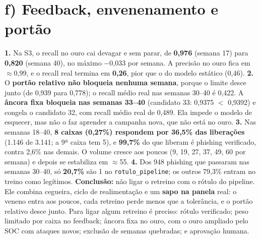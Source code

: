 \documentclass[10pt,a4paper]{article}
\newcommand{\code}[1]{\texttt{\small #1}}
\begin{document}
\section*{f) Feedback, envenenamento e portão}
\textbf{1.} Na S3, o recall no ouro cai devagar e sem parar, de \textbf{0,976} (semana 17) para \textbf{0,820} (semana 40), no máximo $-$0,033 por semana. A precisão no ouro fica em $\approx$0,99, e o recall real termina em \textbf{0,26}, pior que o do modelo estático (0,46).
\textbf{2.} O \textbf{portão relativo não bloqueia nenhuma semana}, porque o limite desce junto (de 0,939 para 0,778); o recall médio real nas semanas 30--40 é 0,422. A \textbf{âncora fixa bloqueia nas semanas 33--40} (candidato 33: 0,9375 $<$ 0,9392) e congela o candidato 32, com recall médio real de 0,489. Ela impede o modelo de esquecer, mas não o faz aprender a campanha nova, que não está no ouro.
\textbf{3.} Nas semanas 18--40, \textbf{8 caixas (0,27\%) respondem por 36,5\% das liberações} (1.146 de 3.141; a 9ª caixa tem 5), e \textbf{99,7\%} do que liberam é phishing verificado, contra 2,6\% nas demais. O volume cresce aos poucos (9, 19, 27, 37, 49, 60 por semana) e depois se estabiliza em $\approx$55.
\textbf{4.} Dos 948 phishing que passaram nas semanas 30--40, só \textbf{20,7\%} são 1 no \code{rotulo\_pipeline}; os outros 79,3\% entram no treino como legítimos.
\textbf{Conclusão:} não ligar o retreino com o rótulo do pipeline. Ele combina cegueira, ciclo de realimentação e um \textbf{sapo na panela} real: o veneno entra aos poucos, cada retreino perde menos que a tolerância, e o portão relativo desce junto. Para ligar algum retreino é preciso: rótulo verificado; peso limitado por caixa no feedback; âncora fixa no ouro, com o ouro ampliado pelo SOC com ataques novos; exclusão de semanas quebradas; e aprovação humana.
\end{document}
